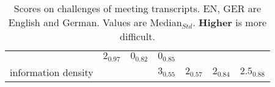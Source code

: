 \begin{table}[t]
\begin{tabular}{l c c c c c c}
            & $2_{\textit{0.97}}$
            & $0_{\textit{0.82}}$
            & $0_{\textit{0.85}}$ \\       
        information density
            & \cellcolor{highlightGreen}{$\textbf{4}_{\textit{0.27}}$}
            & \cellcolor{highlightGreen}{$\textbf{4}_{\textit{0.00}}$}
            & $3_{\textit{0.55}}$
            & $2_{\textit{0.57}}$
            & $2_{\textit{0.84}}$
            & $2.5_{\textit{0.88}}$\\            
        \bottomrule
    \end{tabular}
    \caption{Scores on challenges of meeting transcripts. EN, GER are \dataset{} English and German. 
    Values are Median$_{Std}$. 
    \textbf{Higher} is more difficult.}
    \label{tab:challenge_scores}
\end{table}


